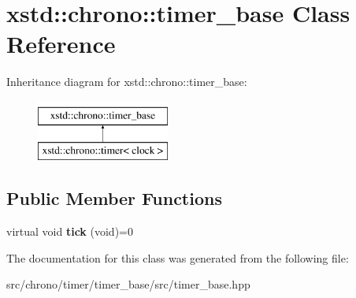 \hypertarget{classxstd_1_1chrono_1_1timer__base}{\section{xstd\-:\-:chrono\-:\-:timer\-\_\-base Class Reference}
\label{classxstd_1_1chrono_1_1timer__base}
}
Inheritance diagram for xstd\-:\-:chrono\-:\-:timer\-\_\-base\-:\begin{figure}[H]
\begin{center}
\leavevmode
\includegraphics[height=2.000000cm]{classxstd_1_1chrono_1_1timer__base}
\end{center}
\end{figure}
\subsection*{Public Member Functions}
\begin{DoxyCompactItemize}
\item 
\hypertarget{classxstd_1_1chrono_1_1timer__base_a2d7c36af22ff593ca31849531fe23fd8}{virtual void {\bfseries tick} (void)=0}\label{classxstd_1_1chrono_1_1timer__base_a2d7c36af22ff593ca31849531fe23fd8}

\end{DoxyCompactItemize}


The documentation for this class was generated from the following file\-:\begin{DoxyCompactItemize}
\item 
src/chrono/timer/timer\-\_\-base/src/timer\-\_\-base.\-hpp\end{DoxyCompactItemize}
